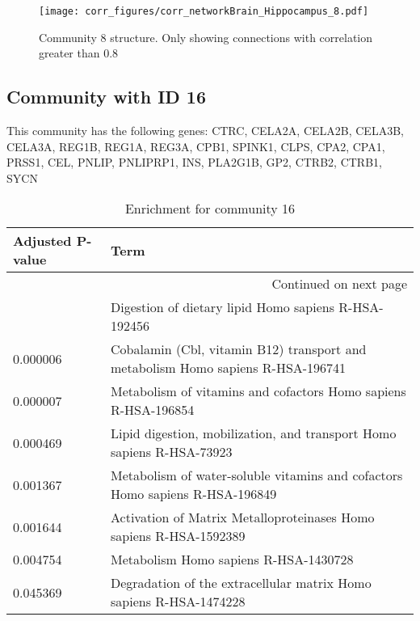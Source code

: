 \begin{figure}[h!]
\centering
\texttt{[image: corr\_figures/corr\_networkBrain\_Hippocampus\_8.pdf]}
\caption{Community 8 structure. Only showing connections with correlation greater than 0.8}
\end{figure}




\subsection*{Community with ID 16}
This community has the following genes: CTRC, CELA2A, CELA2B, CELA3B, CELA3A, REG1B, REG1A, REG3A, CPB1, SPINK1, CLPS, CPA2, CPA1, PRSS1, CEL, PNLIP, PNLIPRP1, INS, PLA2G1B, GP2, CTRB2, CTRB1, SYCN
\\
\begin{longtable}{p{2.4cm}p{14.5cm}}
\caption{Enrichment for community 16}\\
\toprule
Adjusted \newline P-value &                                                                             Term \\
\midrule
\endhead
\midrule
\multicolumn{2}{r}{{Continued on next page}} \\
\midrule
\endfoot

\bottomrule
\endlastfoot
                 0.000005 &                             Digestion of dietary lipid Homo sapiens R-HSA-192456 \\
                 0.000006 &  Cobalamin (Cbl, vitamin B12) transport and metabolism Homo sapiens R-HSA-196741 \\
                 0.000007 &                   Metabolism of vitamins and cofactors Homo sapiens R-HSA-196854 \\
                 0.000469 &            Lipid digestion, mobilization, and transport Homo sapiens R-HSA-73923 \\
                 0.001367 &     Metabolism of water-soluble vitamins and cofactors Homo sapiens R-HSA-196849 \\
                 0.001644 &               Activation of Matrix Metalloproteinases Homo sapiens R-HSA-1592389 \\
                 0.004754 &                                            Metabolism Homo sapiens R-HSA-1430728 \\
                 0.045369 &               Degradation of the extracellular matrix Homo sapiens R-HSA-1474228 \\
\end{longtable}


